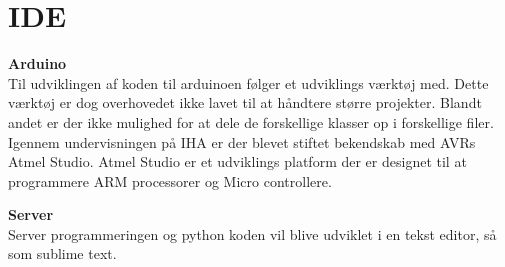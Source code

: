\section{IDE}

\textbf{Arduino} \\
Til udviklingen af koden til arduinoen følger et udviklings værktøj med. Dette værktøj er dog overhovedet ikke lavet til at håndtere større projekter. Blandt andet er der ikke mulighed for at dele de forskellige klasser op i forskellige filer. 
Igennem undervisningen på IHA er der blevet stiftet bekendskab med AVRs Atmel Studio. Atmel Studio er et udviklings platform der er designet til at programmere ARM processorer og Micro controllere.


\textbf{Server} \\
Server programmeringen og python koden vil blive udviklet i en tekst editor, så som sublime text.  